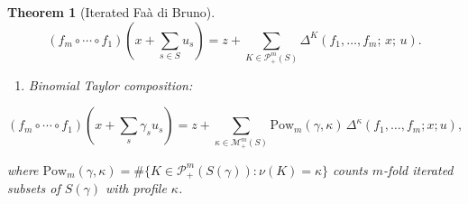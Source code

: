 \documentclass[10pt,a4paper]{article}
\theoremstyle{plain}
\newtheorem{theorem}{Theorem}
\theoremstyle{definition}
\newcommand{\1}{\mathbb{1}} %
\newcommand{\set}[1]{\{#1\}} %
\newcommand{\KP}{\mathcal{P}}
\newcommand{\tightlist}{\setlength{\itemsep}{0pt}\setlength{\parskip}{0pt}}
\newcommand{\KM}{\mathcal{M}} %
\begin{document}
\begin{theorem}[Iterated Faà di Bruno]
\[
  (f_m \circ \cdots \circ f_1)(x + {\textstyle\sum_{s \in S}} u_s) = z + \sum_{K \in \KP_+^m(S)} \Delta^{K}(f_1, \dots, f_m;\, x;\, u).
\]

\begin{enumerate}
\def\labelenumi{\arabic{enumi})}
\setcounter{enumi}{3}
\tightlist
\item
  \emph{Binomial Taylor composition:}
\end{enumerate}

\[
  (f_m \circ \cdots \circ f_1)(x + {\textstyle\sum_s} \gamma_s u_s) = z + \sum_{\kappa \in \KM_+^m(S)} \mathrm{Pow}_m(\gamma, \kappa)\, \Delta^{\kappa}(f_1, \dots, f_m; x; u),
\]

where
\(\mathrm{Pow}_m(\gamma, \kappa) = \#\set{K \in \KP_+^m(S(\gamma)) : \nu(K) = \kappa}\)
counts \(m\)-fold iterated subsets of \(S(\gamma)\) with profile
\(\kappa\).

\end{theorem}
\end{document}

